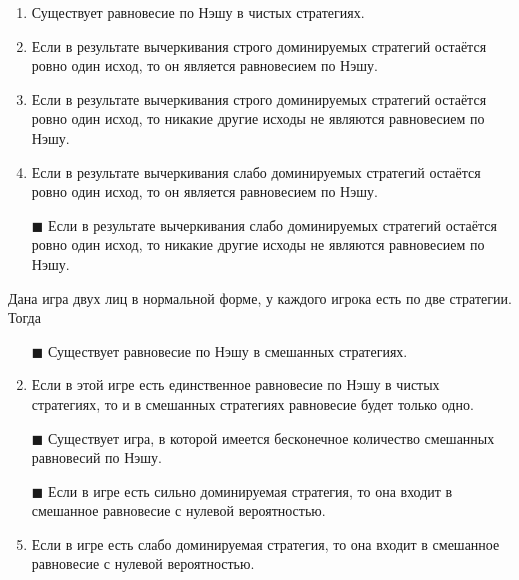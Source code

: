 \begin{enumerate}[label=$\square$]
	
	
	
	
	\item Существует равновесие по Нэшу в чистых стратегиях.
	\item Если в результате вычеркивания строго доминируемых стратегий остаётся ровно один исход, то он является равновесием по Нэшу.
	\item Если в результате вычеркивания строго доминируемых стратегий остаётся ровно один исход, то никакие другие исходы не являются равновесием по Нэшу.
	\item Если в результате вычеркивания слабо доминируемых стратегий остаётся ровно один исход, то он является равновесием по Нэшу.
	\item[$\blacksquare$] Если в результате вычеркивания слабо доминируемых стратегий остаётся ровно один исход, то никакие другие исходы не являются равновесием по Нэшу.
	
\end{enumerate}

\task
Дана игра двух лиц в нормальной форме, у каждого игрока есть по две стратегии. Тогда
\begin{enumerate}[label=$\square$]	%
	\item[$\blacksquare$] Существует равновесие по Нэшу в смешанных стратегиях.
	\item Если в этой игре есть единственное равновесие по Нэшу в чистых стратегиях, то и в смешанных стратегиях равновесие будет только одно.
	\item[$\blacksquare$] Существует игра, в которой имеется бесконечное количество смешанных равновесий по Нэшу.
	\item[$\blacksquare$] Если в игре есть сильно доминируемая стратегия, то она входит в смешанное равновесие с нулевой вероятностью.
	\item Если в игре есть слабо доминируемая стратегия, то она входит в смешанное равновесие с нулевой вероятностью.
\end{enumerate}

